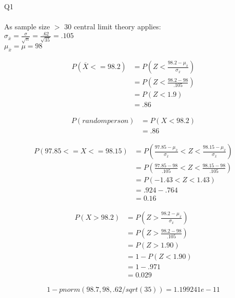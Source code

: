 \documentclass{article}
\begin{document}
Q1\\\\
As sample size $>$ 30 central limit theory applies: \\
$\sigma_{\overline{x}} = \frac{\sigma}{\sqrt{n}} = \frac{.62}{\sqrt{35}} = .105$ \\
$\mu_{\overline{x}} = \mu = 98$

\begin{equation*}
\begin{split}
P(\overline{X} <= 98.2) & = P(Z < \frac{98.2 - \mu_{\overline{x}}}{\sigma_{\overline{x}}}) \\
& = P(Z < \frac{98.2 - 98}{.105})\\
& = P(Z < 1.9)\\
& = .86
\end{split}
\end{equation*}

\begin{equation*}
\begin{split}
P(random person) &= P( X< 98.2)\\
& = .86
\end{split}
\end{equation*}

\begin{equation*}
\begin{split}
P(97.85 <= X <= 98.15) & = P(\frac{97.85 - \mu_{\overline{x}}}{\sigma_{\overline{x}}} < Z < \frac{98.15 - \mu_{\overline{x}}}{\sigma_{\overline{x}}})\\
& = P(\frac{97.85 - 98}{.105} < Z < \frac{98.15 - 98}{.105})\\
& = P(-1.43 < Z < 1.43)\\
& = .924 - .764\\
& = 0.16
\end{split}
\end{equation*}

\begin{equation*}
\begin{split}
P(X > 98.2 ) & = P(Z > \frac{98.2 - \mu_{\overline{x}}}{\sigma_{\overline{x}}})\\
& = P(Z > \frac{98.2 - 98}{.105})\\
& = P(Z > 1.90)\\
& = 1 - P(Z < 1.90)\\
& = 1 - .971\\
& = 0.029
\end{split}
\end{equation*}

\begin{equation*}
1- pnorm(98.7, 98, .62/sqrt(35)) = 1.199241e-11
\end{equation*}
\\
\end{document}
